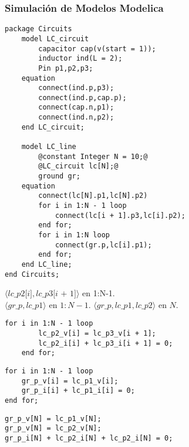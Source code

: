 \begin{frame}[fragile]
\frametitle{Simulación de Modelos Modelica} 
\begin{lstlisting}[style=base,basicstyle=\tiny]
package Circuits
    model LC_circuit
        capacitor cap(v(start = 1));
        inductor ind(L = 2);
        Pin p1,p2,p3;
    equation
        connect(ind.p,p3);
        connect(ind.p,cap.p);
        connect(cap.n,p1);
        connect(ind.n,p2);
    end LC_circuit;
    
    model LC_line
        @constant Integer N = 10;@
        @LC_circuit lc[N];@
        ground gr;
    equation
        connect(lc[N].p1,lc[N].p2)      
        for i in 1:N - 1 loop
            connect(lc[i + 1].p3,lc[i].p2);
        end for;
        for i in 1:N loop
            connect(gr.p,lc[i].p1);
        end for;
    end LC_line;
end Circuits;   
\end{lstlisting}
\end{frame}



$\langle \textit{lc\_p2[i]},\textit{lc\_p3[i + 1]} \rangle$ en 1:N-1.\\
 
$\langle  \textit{gr\_p} , \textit{lc\_p1} \rangle$ en $1:N-1$. 
$\langle \textit{gr\_p}, \textit{lc\_p1},\textit{lc\_p2} \rangle$  en $N$. 


\begin{lstlisting}[style=base]
	for i in 1:N - 1 loop
		lc_p2_v[i] = lc_p3_v[i + 1];
		lc_p2_i[i] + lc_p3_i[i + 1] = 0;
	end for;
\end{lstlisting}

\begin{lstlisting}[style=base]
for i in 1:N - 1 loop
    gr_p_v[i] = lc_p1_v[i];
    gr_p_i[i] + lc_p1_i[i] = 0;
end for;
\end{lstlisting}


\begin{lstlisting}[style=base]
gr_p_v[N] = lc_p1_v[N];  
gr_p_v[N] = lc_p2_v[N];
gr_p_i[N] + lc_p2_i[N] + lc_p2_i[N] = 0;
\end{lstlisting}

